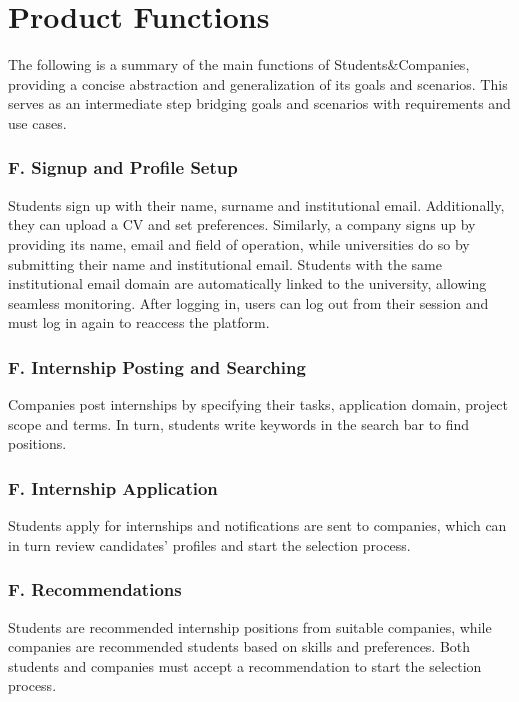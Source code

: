 \section{Product Functions}
The following is a summary of the main functions of Students\&Companies, providing a concise abstraction and generalization of its goals and scenarios.
This serves as an intermediate step bridging goals and scenarios with requirements and use cases.

\setcounter{f}{1}
\newcommand{\fc}{\thef{}}

\subsubsection*{F\fc. Signup and Profile Setup}
Students sign up with their name, surname and institutional email.
Additionally, they can upload a CV and set preferences.
Similarly, a company signs up by providing its name, email and field of operation, while universities do so by submitting their name and institutional email.
Students with the same institutional email domain are automatically linked to the university, allowing seamless monitoring.
After logging in, users can log out from their session and must log in again to reaccess the platform.

\subsubsection*{F\fc. Internship Posting and Searching}
Companies post internships by specifying their tasks, application domain, project scope and terms.
In turn, students write keywords in the search bar to find positions.

\subsubsection*{F\fc. Internship Application}
Students apply for internships and notifications are sent to companies, which can in turn review candidates’ profiles and start the selection process.

\subsubsection*{F\fc. Recommendations}
Students are recommended internship positions from suitable companies, while companies are recommended students based on skills and preferences.
Both students and companies must accept a recommendation to start the selection process.


